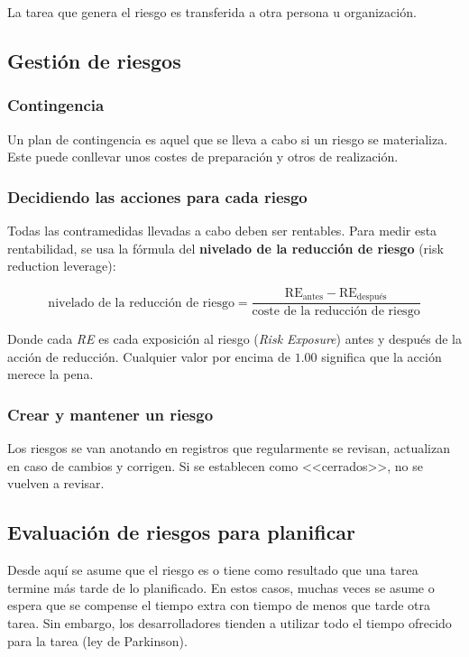 \documentclass[12pt]{article}
\begin{document}
{La tarea que genera el riesgo es transferida a otra persona u organización.}

\subsection{Gestión de riesgos}
\label{7.8.0}

\subsubsection{Contingencia}
\label{7.8.1}

{Un plan de contingencia es aquel que se lleva a cabo si un riesgo se materializa. Este puede conllevar unos costes de preparación y otros de realización.}

\subsubsection{Decidiendo las acciones para cada riesgo}
\label{7.8.2}

{Todas las contramedidas llevadas a cabo deben ser rentables. Para medir esta rentabilidad, se usa la fórmula del \textbf{nivelado de la reducción de riesgo} (risk reduction leverage):}

\begin{equation}
    \text{nivelado de la reducción de riesgo} = \frac{\text{RE}_\text{antes} - \text{RE}_\text{después}}{\text{coste de la reducción de riesgo}}
\end{equation}

{Donde cada \textit{RE} es cada exposición al riesgo (\textit{Risk Exposure}) antes y después de la acción de reducción. Cualquier valor por encima de $1.00$ significa que la acción merece la pena.}

\subsubsection{Crear y mantener un riesgo}
\label{7.8.3}

{Los riesgos se van anotando en registros que regularmente se revisan, actualizan en caso de cambios y corrigen. Si se establecen como <<cerrados>>, no se vuelven a revisar.}

\subsection{Evaluación de riesgos para planificar}
\label{7.9.0}

{Desde aquí se asume que el riesgo es o tiene como resultado que una tarea termine más tarde de lo planificado. En estos casos, muchas veces se asume o espera que se compense el tiempo extra con tiempo de menos que tarde otra tarea. Sin embargo, los desarrolladores tienden a utilizar todo el tiempo ofrecido para la tarea (ley de Parkinson).}
\end{document}
